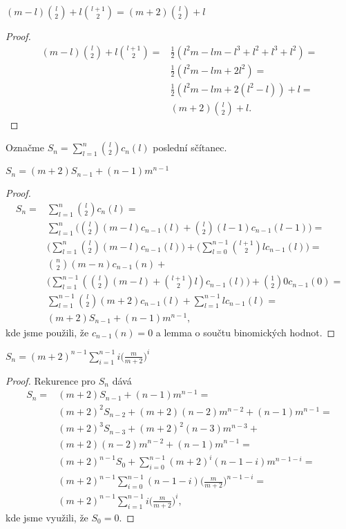 \documentclass[a4paper,12pt]{article}
\begin{document}
\begin{lemma}
    $(m-l)\binom l2+l\binom {l+1}2 = (m+2)\binom l2+l$
\end{lemma}
\begin{proof}
    \begin{align*}(m-l)\binom l2+l\binom {l+1}2=&\frac 12(l^2m-lm-l^3+l^2+l^
    3+l^2)=\\
    &\frac 12(l^2m-lm+2l^2)=\\
    &\frac 12(l^2m-lm+2(l^2-l))+l=\\
    &(m+2)\binom l2+l.\end{align*}
\end{proof}

Označme $S_n=\sum_{l=1}^n\binom l2c_n(l)$ poslední sčítanec.

\begin{lemma}
    $S_n = (m+2)S_{n-1}+(n-1)m^{n-1}$
\end{lemma}

\begin{proof}
\begin{align*} S_n=&\sum_{l=1}^n\binom l2c_n(l)=\\
&\sum_{l=1}^n\big(\binom l2(m-l)c_{n-1}(l)+\binom l2(l-1)c_{n-1}(
l-1)\big)=\\
&\big(\sum_{l=1}^n\binom l2(m-l)c_{n-1}(l)\big)+\big(\sum_{l=0}^{
n-1}\binom {l+1}2lc_{n-1}(l)\big)=\\
&\binom n2(m-n)c_{n-1}(n)+\\
&\big(\sum_{l=1}^{n-1}(\binom l2(m-l)+\binom {l+1}2l)c_{n-1}(l)\big
)+\binom 120c_{n-1}(0)=\\
&\sum_{l=1}^{n-1}\binom l2(m+2)c_{n-1}(l)+\sum_{l=1}^{n-1}lc_{n-1}
(l)=\\
&(m+2)S_{n-1}+(n-1)m^{n-1},\end{align*}
kde jsme použili, že $c_{n-1}(n)=0$ a lemma o součtu binomických hodnot.
\end{proof}

\begin{lemma}
    $S_n = (m+2)^{n-1}\sum_{i=1}^{n-1}i\big(\frac m{m+2}\big)^i$
\end{lemma}

\begin{proof}
Rekurence pro $S_n$ dává 
\begin{align*} S_n=&(m+2)S_{n-1}+(n-1)m^{n-1}=\\
&(m+2)^2S_{n-2}+(m+2)(n-2)m^{n-2}+(n-1)m^{n-1}=\\
&(m+2)^3S_{n-3}+(m+2)^2(n-3)m^{n-3}+\\
&(m+2)(n-2)m^{n-2}+(n-1)m^{n-1}=\\
&(m+2)^{n-1}S_0+\sum_{i=0}^{n-1}(m+2)^i(n-1-i)m^{n-1-i}=\\
&(m+2)^{n-1}\sum_{i=0}^{n-1}(n-1-i)\big(\frac m{m+2}\big)^{n-1-i}
=\\
&(m+2)^{n-1}\sum_{i=1}^{n-1}i\big(\frac m{m+2}\big)^i,\end{align*}
kde jsme využili, že $S_0=0$. 
\end{proof}
\end{document}
